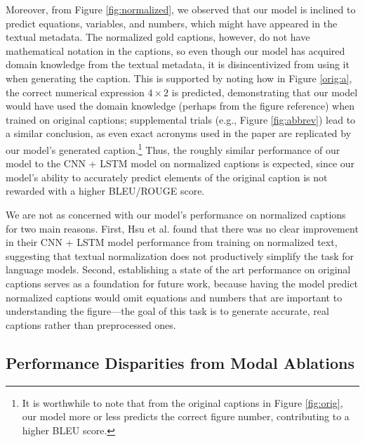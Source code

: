 \documentclass{article}
\begin{document}
Moreover, from Figure \ref{fig:normalized}, we observed that our model is inclined to predict equations, variables, and numbers, which might have appeared in the textual metadata. The normalized gold captions, however, do not have mathematical notation in the captions, so even though our model has acquired domain knowledge from the textual metadata, it is disincentivized from using it when generating the caption. This is supported by noting how in Figure \ref{orig:a}, the correct numerical expression $4 \times 2$ is predicted, demonstrating that our model would have used the domain knowledge (perhaps from the figure reference) when trained on original captions; supplemental trials (e.g., Figure \ref{fig:abbrev}) lead to a similar conclusion, as even exact acronyms used in the paper are replicated by our model's generated caption.\footnote{It is worthwhile to note that from the original captions in Figure \ref{fig:orig}, our model more or less predicts the correct figure number, contributing to a higher BLEU score.} Thus, the roughly similar performance of our model to the CNN + LSTM model on normalized captions is expected, since our model's ability to accurately predict elements of the original caption is not rewarded with a higher BLEU/ROUGE score. 

We are not as concerned with our model's performance on normalized captions for two main reasons. First, Hsu et al. found that there was no clear improvement in their CNN + LSTM model performance from training on normalized text, suggesting that textual normalization does not productively simplify the task for language models. Second, establishing a state of the art performance on original captions serves as a foundation for future work, because having the model predict normalized captions would omit equations and numbers that are important to understanding the figure---the goal of this task is to generate accurate, real captions rather than preprocessed ones.


\subsection{Performance Disparities from Modal Ablations}
\end{document}
